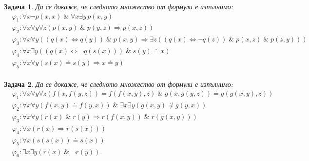 \documentclass[12pt]{article}
\newtheorem{problem}{Задача}[section]
\theoremstyle{definition}
\theoremstyle{remark}
\begin{document}
\begin{problem}
Да се докаже, че следното множество от формули е изпълнимо:
\begin{align*}
       & \varphi_1 : \forall x \neg p(x, x) \; \& \; \forall x \exists y \, p(x, y)                                                                                                \\
       & \varphi_2 : \forall x \forall y \forall z (p(x, y) \; \& \; p(y, z) \Rightarrow p(x, z))                                                                                  \\
       & \varphi_3 : \forall x \forall y ((q(x) \Leftrightarrow q(y)) \; \& \; p(x, y) \Rightarrow \exists z ((q(x) \Leftrightarrow \neg q(z)) \; \& \; p(x, z) \; \& \; p(z, y))) \\
       & \varphi_4 : \forall x \exists y ((q(x) \Leftrightarrow \neg q(s(x))) \; \& \; s(y) \doteq x)                                                                              \\
       & \varphi_5 : \forall x \forall y (s(x) \doteq s(y) \Rightarrow x \doteq y)                                                                                                 \\
\end{align*}
\end{problem}

\begin{problem}
Да се докаже, че следното множество от формули е изпълнимо:
\begin{align*}
       & \varphi_1 : \forall x \forall y \forall z (f(x, f(y, z)) \doteq f(f(x, y), z) \; \& \; g(x, g(y, z)) \doteq g(g(x, y), z)) \\
       & \varphi_2 : \forall x \forall y (f(x, y) \doteq f(y, x)) \; \& \; \exists x \exists y (g(x, y) \not \doteq g(y, x))        \\
       & \varphi_3 : \forall x \forall y (r(x) \; \& \; r(y) \Rightarrow r(f(x, y)) \; \& \; r(g(x, y)))                            \\
       & \varphi_4 : \forall x (r(x) \Rightarrow r(s(x)))                                                                           \\
       & \varphi_5 : \forall x (s(s(x)) \doteq s(x))                                                                                \\
       & \varphi_6 : \exists x \exists y (r(x) \; \& \; \neg r(y)).
\end{align*}
\end{problem}
\end{document}
